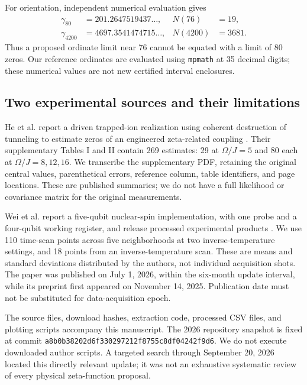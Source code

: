 \documentclass[aps,pra,onecolumn,amsmath,amssymb,nofootinbib,superscriptaddress,floatfix,11pt]{revtex4-2}
\begin{document}
For orientation, independent numerical evaluation gives
\begin{align}
 \gamma_{80}&=201.2647519437\ldots, &N(76)&=19,\\
 \gamma_{4200}&=4697.3541474715\ldots, &N(4200)&=3681.
\end{align}
Thus a proposed ordinate limit near 76 cannot be equated with a limit of 80 zeros. Our reference ordinates are evaluated using \texttt{mpmath} at 35 decimal digits; these numerical values are not new certified interval enclosures.

\subsection{Two experimental sources and their limitations}
He et al. report a driven trapped-ion realization using coherent destruction of tunneling to estimate zeros of an engineered zeta-related coupling \cite{He2021}. Their supplementary Tables I and II contain 269 estimates: 29 at $\Omega/J=5$ and 80 each at $\Omega/J=8,12,16$. We transcribe the supplementary PDF, retaining the original central values, parenthetical errors, reference column, table identifiers, and page locations. These are published summaries; we do not have a full likelihood or covariance matrix for the original measurements.

Wei et al. report a five-qubit nuclear-spin implementation, with one probe and a four-qubit working register, and release processed experimental products \cite{Wei2026}. We use 110 time-scan points across five neighborhoods at two inverse-temperature settings, and 18 points from an inverse-temperature scan. These are means and standard deviations distributed by the authors, not individual acquisition shots. The paper was published on July 1, 2026, within the six-month update interval, while its preprint first appeared on November 14, 2025. Publication date must not be substituted for data-acquisition epoch.

The source files, download hashes, extraction code, processed CSV files, and plotting scripts accompany this manuscript. The 2026 repository snapshot is fixed at commit \texttt{a8b0b38202d6f330297212f8755c8df04242f9d6}. We do not execute downloaded author scripts. A targeted search through September 20, 2026 located this directly relevant update; it was not an exhaustive systematic review of every physical zeta-function proposal.
\end{document}
